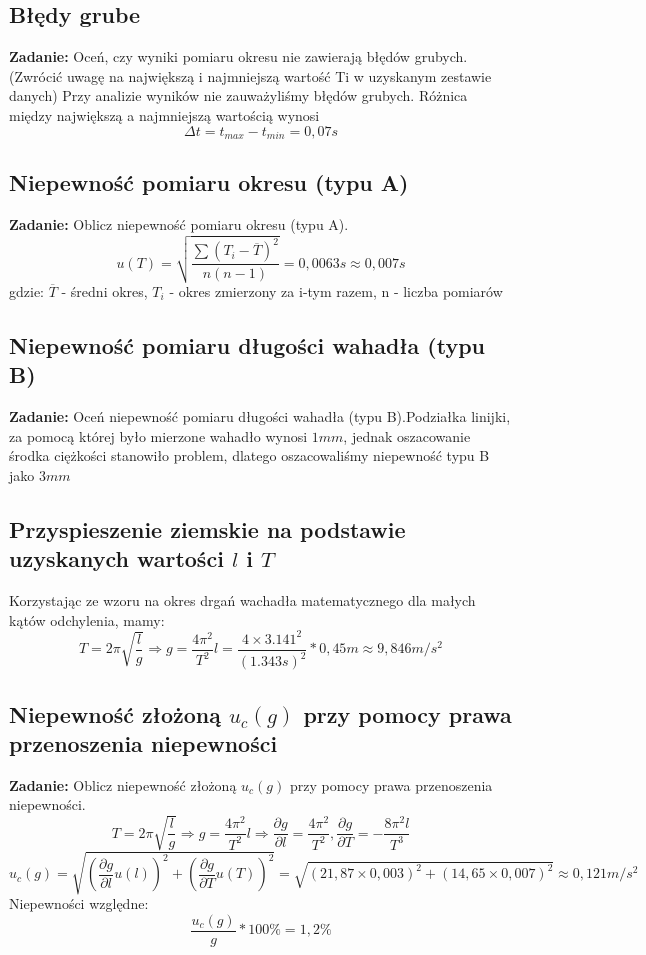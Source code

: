 \documentclass[18pt, twoside]{article}
\begin{document}
    \subsection{Błędy grube}
    \textbf{Zadanie:} Oceń, czy wyniki pomiaru okresu nie zawierają błędów grubych. (Zwrócić uwagę na największą 
    i najmniejszą wartość Ti w uzyskanym zestawie danych)\newline
    Przy analizie wyników nie zauważyliśmy błędów grubych. Różnica między największą a najmniejszą wartością wynosi \[\Delta t = t_{max} - t_{min} = 0,07s \]
    
    \subsection{Niepewność pomiaru okresu (typu A)}
    \textbf{Zadanie:} Oblicz niepewność pomiaru okresu (typu A). \newline
    \[u(T) =\sqrt{\frac{\sum{(T_i - \overline T)^2}}{n(n-1)}} = 0,0063s \approx 0,007s \] gdzie:  \(\overline T\) - średni okres, \(T_i\) - okres zmierzony za i-tym razem, n - liczba pomiarów
    
    \subsection{Niepewność pomiaru długości wahadła (typu B)}
    \textbf{Zadanie:} Oceń niepewność pomiaru długości wahadła (typu B).\newline Podziałka linijki, za pomocą której było mierzone wahadło wynosi \(1mm\), jednak oszacowanie środka ciężkości stanowiło problem, dlatego oszacowaliśmy niepewność typu B jako \(3mm\)
    
    \subsection{Przyspieszenie ziemskie  na podstawie uzyskanych wartości \(l\) i \(T\)}
    Korzystając ze wzoru na okres drgań wachadła matematycznego dla małych kątów odchylenia, mamy: \[T = 2\pi \sqrt{\frac{l}{g}} \Rightarrow g = \frac{4\pi^2}{T^2}l = \frac{4 \times 3.141^2}{(1.343s)^2} * 0,45m  \approx 9,846 m/s^2\]
    
    \subsection{Niepewność złożoną \(u_c(g)\) przy pomocy prawa przenoszenia niepewności}
    \textbf{Zadanie:} Oblicz niepewność złożoną \(u_c(g)\) przy pomocy prawa przenoszenia niepewności. \newline
    \[T = 2\pi \sqrt{\frac{l}{g}} \Rightarrow g = \frac{4\pi^2}{T^2}l  \Rightarrow \frac{\partial g}{\partial l} = \frac{4\pi^2}{T^2},\frac{\partial g}{\partial T} = -\frac{8\pi^2l}{T^3} \]
    \[u_c(g) = \sqrt{(\frac{\partial g}{\partial l} u(l))^2 + (\frac{\partial g}{\partial T} u(T))^2} = 
    	\sqrt{(21,87\times0,003)^2 + (14,65\times0,007)^2}
	 \approx 0,121 m/s^2\]
	Niepewności względne:
	\[\frac{u_c(g)}{g} * 100\% = 1,2\% \]
	
\end{document}
